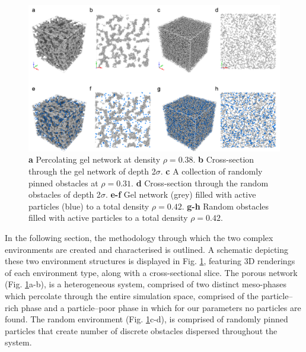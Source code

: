 \begin{figure}
	\centering
	\includegraphics[width=\linewidth]{chapters/activeConfinement/figsActiveConfinement/figObstacles.png}
	\caption[Confining structures: colloidal gels and random pinning]{\textbf{a} Percolating gel network at density $\rho= 0.38$. \textbf{b} Cross-section through the gel network of depth 2$\sigma$.  \textbf{c} A collection of randomly pinned obstacles at $\rho =0.31$. \textbf{d} Cross-section through the random obstacles of depth 2$\sigma$. \textbf{e-f} Gel network (grey) filled with active particles (blue) to a total density $\rho=0.42$. \textbf{g-h} Random obstacles filled with active particles to a total density $\rho=0.42$.}
	\label{fig:Gel_vs_Rand}
\end{figure}

In the following section, the methodology through which the two complex environments are created and characterised is outlined. A schematic depicting these two environment structures is displayed in Fig. \ref{fig:Gel_vs_Rand}, featuring 3D renderings of each environment type, along with a cross-sectional slice. The porous network (Fig. \ref{fig:Gel_vs_Rand}a-b), is a heterogeneous system, comprised of two distinct meso-phases which percolate through the entire simulation space, comprised of the particle–rich phase and a particle–poor phase in which for our parameters no particles are found.  The random environment (Fig. \ref{fig:Gel_vs_Rand}c-d), is comprised of randomly pinned particles that create number of discrete obstacles dispersed throughout the system. 



